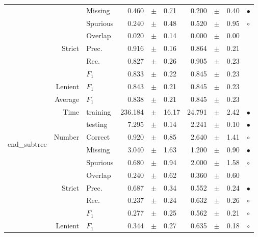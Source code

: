 \begin{longtable}{|r|r|l||rcl|rcl|c|}
\cline{3-10}
  &  &  Missing  & 0.460 &  $\pm$  & 0.71 & 0.200 &  $\pm$  & 0.40 &  $\bullet$\\
\cline{3-10}
  &  &  Spurious  & 0.240 &  $\pm$  & 0.48 & 0.520 &  $\pm$  & 0.95 &  $\circ$\\
\cline{3-10}
  &  &  Overlap  & 0.020 &  $\pm$  & 0.14 & 0.000 &  $\pm$  & 0.00 &   \\
\cline{2-10}
  & \multirow{3}{*}{Strict} &  Prec.  & 0.916 &  $\pm$  & 0.16 & 0.864 &  $\pm$  & 0.21 &   \\
\cline{3-10}
  &  &  Rec.  & 0.827 &  $\pm$  & 0.26 & 0.905 &  $\pm$  & 0.23 &   \\
\cline{3-10}
  &  &  $F_1$  & 0.833 &  $\pm$  & 0.22 & 0.845 &  $\pm$  & 0.23 &   \\
\cline{2-10}
  & Lenient &  $F_1$  & 0.843 &  $\pm$  & 0.21 & 0.845 &  $\pm$  & 0.23 &   \\
\cline{2-10}
  & Average &  $F_1$  & 0.838 &  $\pm$  & 0.21 & 0.845 &  $\pm$  & 0.23 &   \\
\cline{2-10}
  & \multirow{2}{*}{Time} &  training  & 236.184 &  $\pm$  & 16.17 & 24.791 &  $\pm$  & 2.42 &  $\bullet$\\
\cline{3-10}
  &  &  testing  & 7.295 &  $\pm$  & 0.14 & 2.241 &  $\pm$  & 0.10 &  $\bullet$\\
\hline
\hline
\multirow{11}{*}{\begin{sideways}end\_subtree\end{sideways} } & \multirow{4}{*}{Number} &  Correct  & 0.920 &  $\pm$  & 0.85 & 2.640 &  $\pm$  & 1.41 &  $\circ$\\
\cline{3-10}
  &  &  Missing  & 3.040 &  $\pm$  & 1.63 & 1.200 &  $\pm$  & 0.90 &  $\bullet$\\
\cline{3-10}
  &  &  Spurious  & 0.680 &  $\pm$  & 0.94 & 2.000 &  $\pm$  & 1.58 &  $\circ$\\
\cline{3-10}
  &  &  Overlap  & 0.240 &  $\pm$  & 0.62 & 0.360 &  $\pm$  & 0.60 &   \\
\cline{2-10}
  & \multirow{3}{*}{Strict} &  Prec.  & 0.687 &  $\pm$  & 0.34 & 0.552 &  $\pm$  & 0.24 &  $\bullet$\\
\cline{3-10}
  &  &  Rec.  & 0.237 &  $\pm$  & 0.24 & 0.632 &  $\pm$  & 0.26 &  $\circ$\\
\cline{3-10}
  &  &  $F_1$  & 0.277 &  $\pm$  & 0.25 & 0.562 &  $\pm$  & 0.21 &  $\circ$\\
\cline{2-10}
  & Lenient &  $F_1$  & 0.344 &  $\pm$  & 0.27 & 0.635 &  $\pm$  & 0.18 &  $\circ$\\

\end{longtable}
